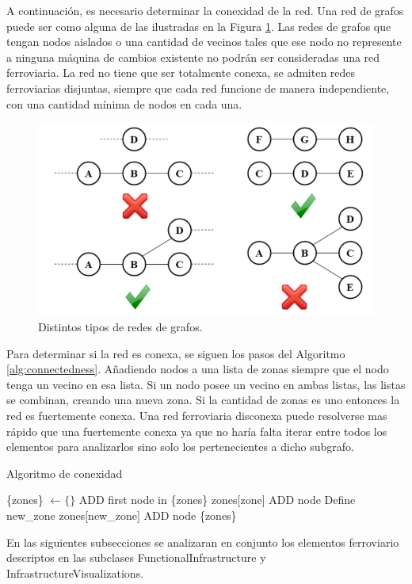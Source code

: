     A continuación, es necesario determinar la conexidad de la red. Una red de grafos puede ser como alguna de las ilustradas en la Figura \ref{fig:conexidad}. Las redes de grafos que tengan nodos aislados o una cantidad de vecinos tales que ese nodo no represente a ninguna máquina de cambios existente no podrán ser consideradas una red ferroviaria. La red no tiene que ser totalmente conexa, se admiten redes ferroviarias disjuntas, siempre que cada red funcione de manera independiente, con una cantidad mínima de nodos en cada una.   

    \begin{figure}[!h]
        \centering
        \includegraphics[width=1\textwidth]{Figuras/conexo.PNG}
        \centering\caption{Distintos tipos de redes de grafos.}
        \label{fig:conexidad}
    \end{figure}

    Para determinar si la red es conexa, se siguen los pasos del Algoritmo \ref{alg:connectedness}. Añadiendo nodos a una lista de zonas siempre que el nodo tenga un vecino en esa lista. Si un nodo posee un vecino en ambas listas, las listas se combinan, creando una nueva zona. Si la cantidad de zonas es uno entonces la red es fuertemente conexa. Una red ferroviaria disconexa puede resolverse mas rápido que una fuertemente conexa ya que no haría falta iterar entre todos los elementos para analizarlos sino solo los pertenecientes a dicho subgrafo.
        
    \begin{algorithm}
        \label{alg:connectedness}
        \caption{Algoritmo de conexidad}
        \begin{algorithmic}
            \STATE \{zones\} $\gets \{ \}$
            \STATE ADD first node in \{zones\}
                            \STATE zones[zone] ADD node
                        \ELSE
                            \STATE Define new\_zone
                            \STATE zones[new\_zone] ADD node
                        \ENDIF
                    \ENDIF
                \ENDFOR
            \ENDFOR 
            \OUTPUT \{zones\}   
        \end{algorithmic}
    \end{algorithm}
        
    En las siguientes subsecciones se analizaran en conjunto los elementos ferroviario descriptos en las subclases FunctionalInfrastructure y InfrastructureVisualizations.